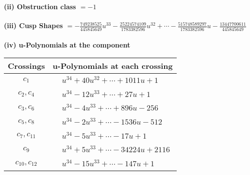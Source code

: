 \documentclass[1p]{elsarticle_modified}
\theoremstyle{definition}
\begin{document}
\flushleft \textbf{(ii) Obstruction class $= -1$}\\~\\
\flushleft \textbf{(iii) Cusp Shapes $= -\frac{749238525}{445845649} u^{33}-\frac{25224574109}{1783382596} u^{32}+\cdots-\frac{515748589297}{1783382596} u-\frac{13447700611}{445845649}$}\\~\\
\newpage\renewcommand{\arraystretch}{1}
\flushleft \textbf{(iv) u-Polynomials at the component}\newline \\
\begin{tabular}{m{50pt}|m{274pt}}
Crossings & \hspace{64pt}u-Polynomials at each crossing \\
\hline $$\begin{aligned}c_{1}\end{aligned}$$&$\begin{aligned}
&u^{34}+40 u^{32}+\cdots+1011 u+1
\end{aligned}$\\
\hline $$\begin{aligned}c_{2},c_{4}\end{aligned}$$&$\begin{aligned}
&u^{34}-12 u^{33}+\cdots+27 u+1
\end{aligned}$\\
\hline $$\begin{aligned}c_{3},c_{6}\end{aligned}$$&$\begin{aligned}
&u^{34}-4 u^{33}+\cdots+896 u-256
\end{aligned}$\\
\hline $$\begin{aligned}c_{5},c_{8}\end{aligned}$$&$\begin{aligned}
&u^{34}-2 u^{33}+\cdots-1536 u-512
\end{aligned}$\\
\hline $$\begin{aligned}c_{7},c_{11}\end{aligned}$$&$\begin{aligned}
&u^{34}-5 u^{33}+\cdots-17 u+1
\end{aligned}$\\
\hline $$\begin{aligned}c_{9}\end{aligned}$$&$\begin{aligned}
&u^{34}+5 u^{33}+\cdots-34224 u+2116
\end{aligned}$\\
\hline $$\begin{aligned}c_{10},c_{12}\end{aligned}$$&$\begin{aligned}
&u^{34}-15 u^{33}+\cdots-147 u+1
\end{aligned}$\\
\hline
\end{tabular}\\~\\
\end{document}
